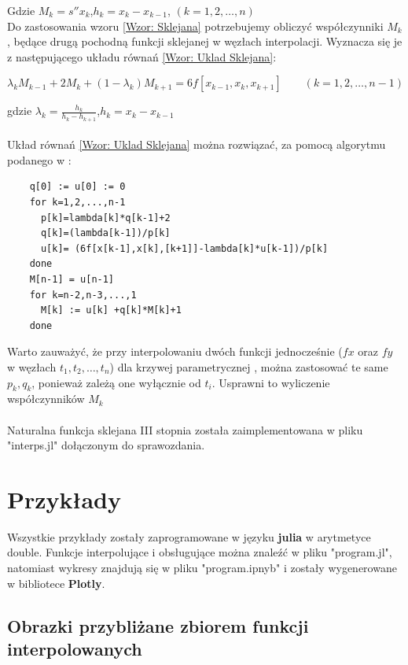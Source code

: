 \documentclass{article}
\begin{document}
	Gdzie $M_k=s''x_k$,\quad $h_k=x_k-x_{k-1}$, \quad$(k=1,2,\dots,n)$\\
	
	Do zastosowania wzoru \eqref{Wzor: Sklejana} potrzebujemy obliczyć współczynniki $M_k$, będące drugą pochodną funkcji sklejanej w węzłach interpolacji. Wyznacza się je z następującego układu równań \eqref{Wzor: Uklad Sklejana}:
	
	\begin{equation}\label{Wzor: Uklad Sklejana}
	\lambda_kM_{k-1} + 2M_k + (1-\lambda_k)M_{k+1} = 6f[x_{k-1},x_k,x_{k+1}] \qquad (k=1,2,\dots,n-1)
	\end{equation}
	
	gdzie $\lambda_k = \frac{h_k}{h_k-h_{k+1}}$,\quad $h_k=x_k-x_{k-1}$
	\\\\
	Układ równań \ref{Wzor: Uklad Sklejana} można rozwiązać, za pomocą algorytmu podanego w \cite{SLE}:
	
	\begin{verbatim} 
	q[0] := u[0] := 0
	for k=1,2,...,n-1
	  p[k]=lambda[k]*q[k-1]+2
	  q[k]=(lambda[k-1])/p[k]
	  u[k]= (6f[x[k-1],x[k],[k+1]]-lambda[k]*u[k-1])/p[k]
	done
	M[n-1] = u[n-1]
	for k=n-2,n-3,...,1
	  M[k] := u[k] +q[k]*M[k]+1
	done
	\end{verbatim}
	
	Warto zauważyć, że przy interpolowaniu dwóch funkcji jednocześnie ($fx$ oraz $fy$ w węzłach $t_1,t_2,\dots,t_n$) dla krzywej parametrycznej , można zastosować te same $p_k,q_k$, ponieważ zależą one wyłącznie od $t_i$. Usprawni to wyliczenie współczynników $M_k$
	\\\\
	Naturalna funkcja sklejana III stopnia została zaimplementowana w pliku "interps.jl" dołączonym do sprawozdania.
	
\section{Przykłady}
	
	Wszystkie przykłady zostały zaprogramowane w języku \textbf{julia} w arytmetyce double. Funkcje interpolujące i obsługujące można znaleźć w pliku "program.jl", natomiast wykresy znajdują się w pliku "program.ipnyb" i zostały wygenerowane w bibliotece \textbf{Plotly}.

\subsection{Obrazki przybliżane zbiorem funkcji interpolowanych}	
	
\end{document}
